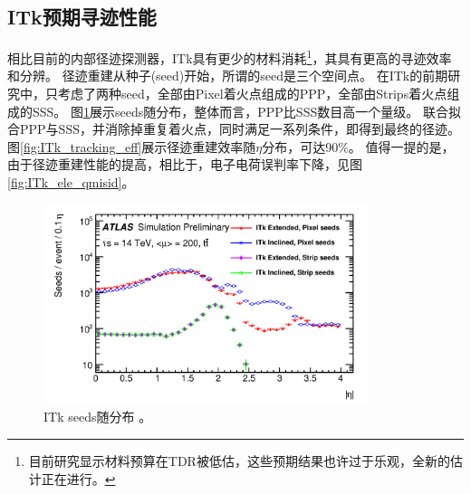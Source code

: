 \subsection{ITk预期寻迹性能}
相比目前的内部径迹探测器，ITk具有更少的材料消耗\footnote{目前研究显示材料预算在TDR被低估，这些预期结果也许过于乐观，全新的估计正在进行。}，其具有更高的寻迹效率和分辨。
径迹重建从种子(seed)开始，所谓的seed是三个空间点。
在ITk的前期研究中，只考虑了两种seed，全部由Pixel着火点组成的PPP，全部由Strips着火点组成的SSS。
图\ref{fig:ITk_seeds}展示seeds随\abseta 分布，整体而言，PPP比SSS数目高一个量级。
联合拟合PPP与SSS，并消除掉重复着火点，同时满足一系列条件，即得到最终的径迹。
图\ref{fig:ITk_tracking_eff}展示径迹重建效率随$\eta$分布，可达90\%。
值得一提的是，由于径迹重建性能的提高，相比于\RunTwo ，电子电荷误判率下降，见图\ref{fig:ITk_ele_qmisid}。
\begin{figure}[h]
\centering
 \includegraphics[width=0.85\textwidth]{fig/ITk_seeds.png}
 \caption{ITk seeds随\abseta 分布%
\cite{seeds_ITk}。}
 \label{fig:ITk_seeds}
\end{figure}
